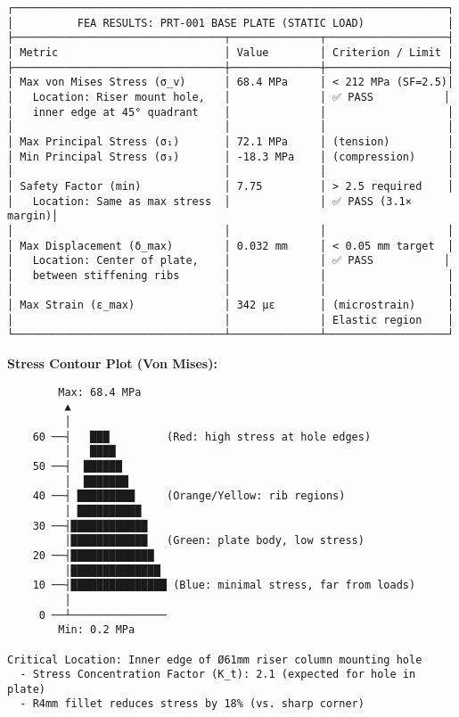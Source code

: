 \documentclass[
]{article}
\begin{document}
\begin{verbatim}
┌────────────────────────────────────────────────────────────────────┐
│          FEA RESULTS: PRT-001 BASE PLATE (STATIC LOAD)             │
├─────────────────────────────────┬──────────────┬───────────────────┤
│ Metric                          │ Value        │ Criterion / Limit │
├─────────────────────────────────┼──────────────┼───────────────────┤
│ Max von Mises Stress (σ_v)      │ 68.4 MPa     │ < 212 MPa (SF=2.5)│
│   Location: Riser mount hole,   │              │ ✅ PASS           │
│   inner edge at 45° quadrant    │              │                   │
│                                 │              │                   │
│ Max Principal Stress (σ₁)       │ 72.1 MPa     │ (tension)         │
│ Min Principal Stress (σ₃)       │ -18.3 MPa    │ (compression)     │
│                                 │              │                   │
│ Safety Factor (min)             │ 7.75         │ > 2.5 required    │
│   Location: Same as max stress  │              │ ✅ PASS (3.1× margin)│
│                                 │              │                   │
│ Max Displacement (δ_max)        │ 0.032 mm     │ < 0.05 mm target  │
│   Location: Center of plate,    │              │ ✅ PASS           │
│   between stiffening ribs       │              │                   │
│                                 │              │                   │
│ Max Strain (ε_max)              │ 342 με       │ (microstrain)     │
│                                 │              │ Elastic region    │
└─────────────────────────────────┴──────────────┴───────────────────┘
\end{verbatim}

\textbf{Stress Contour Plot (Von Mises):}

\begin{verbatim}
        Max: 68.4 MPa
         ▲
         │
    60 ──┤   ███         (Red: high stress at hole edges)
         │   ████
    50 ──┤  ██████
         │  ███████
    40 ──┤ █████████     (Orange/Yellow: rib regions)
         │ ██████████
    30 ──┤████████████
         │████████████   (Green: plate body, low stress)
    20 ──┤█████████████
         │██████████████
    10 ──┤███████████████ (Blue: minimal stress, far from loads)
         │
     0 ──┴───────────────
        Min: 0.2 MPa

Critical Location: Inner edge of Ø61mm riser column mounting hole
  - Stress Concentration Factor (K_t): 2.1 (expected for hole in plate)
  - R4mm fillet reduces stress by 18% (vs. sharp corner)
\end{verbatim}
\end{document}

